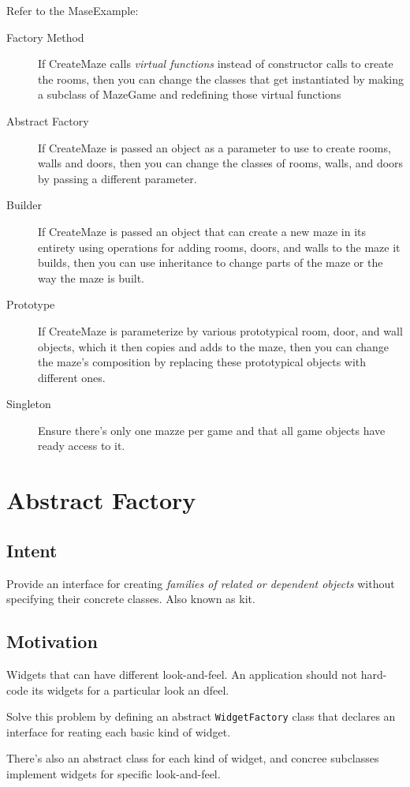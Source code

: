\documentclass[11pt, a4paper]{book}
\begin{document}
Refer to the MaseExample:
\begin{description}
    \item [Factory Method] If CreateMaze calls \emph{virtual functions} instead of constructor
    calls to create the rooms, then you can change the classes that get
    instantiated by making a subclass of MazeGame and redefining those virtual
    functions
    \item [Abstract Factory]If CreateMaze is passed an object as a parameter to use to create
    rooms, walls and doors, then you can change the classes of rooms, walls, and
    doors by passing a different parameter.
    \item [Builder] If CreateMaze is passed an object that can create a new maze
    in its entirety using operations for adding rooms, doors, and walls to the
    maze it builds, then you can use inheritance to change parts of the maze or
    the way the maze is built.
    \item [Prototype] If CreateMaze is parameterize by various prototypical
    room, door, and wall objects, which it then copies and adds to the maze,
    then you can change the maze's composition by replacing these prototypical
    objects with different ones.
    \item [Singleton] Ensure there's only one mazze per game and that all game
    objects have ready access to it.
\end{description}

\section{Abstract Factory}
\subsection{Intent}
Provide an interface for creating \emph{families of related or dependent
objects} without specifying their concrete classes. Also known as kit.
\subsection{Motivation}
Widgets that can have different look-and-feel. An application should not
hard-code its widgets for a particular look an dfeel.

Solve this problem by defining an abstract \verb|WidgetFactory| class that
declares an interface for reating each basic kind of widget.

There's also an abstract class for each kind of widget, and concree subclasses
implement widgets for specific look-and-feel.
\end{document}
